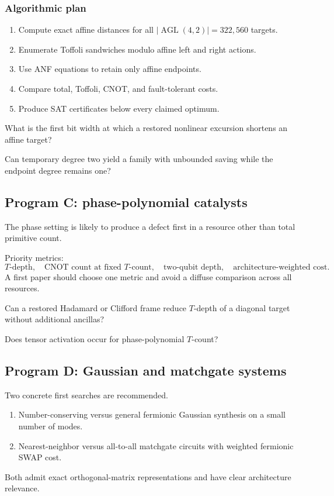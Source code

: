 \subsubsection{Algorithmic plan}
\begin{enumerate}
\item Compute exact affine distances for all $|\operatorname{AGL}(4,2)|=322{,}560$ targets.
\item Enumerate Toffoli sandwiches modulo affine left and right actions.
\item Use ANF equations to retain only affine endpoints.
\item Compare total, Toffoli, CNOT, and fault-tolerant costs.
\item Produce SAT certificates below every claimed optimum.
\end{enumerate}

\begin{question}
What is the first bit width at which a restored nonlinear excursion shortens an affine target?
\end{question}
\begin{question}
Can temporary degree two yield a family with unbounded saving while the endpoint degree remains one?
\end{question}

\subsection{Program C: phase-polynomial catalysts}
The phase setting is likely to produce a defect first in a resource other than total primitive count.

Priority metrics:
\[
T\text{-depth},
\quad
\text{CNOT count at fixed }T\text{-count},
\quad
\text{two-qubit depth},
\quad
\text{architecture-weighted cost}.
\]
A first paper should choose one metric and avoid a diffuse comparison across all resources.

\begin{question}
Can a restored Hadamard or Clifford frame reduce $T$-depth of a diagonal target without additional ancillas?
\end{question}
\begin{question}
Does tensor activation occur for phase-polynomial $T$-count?
\end{question}

\subsection{Program D: Gaussian and matchgate systems}
Two concrete first searches are recommended.
\begin{enumerate}
\item Number-conserving versus general fermionic Gaussian synthesis on a small number of modes.
\item Nearest-neighbor versus all-to-all matchgate circuits with weighted fermionic SWAP cost.
\end{enumerate}
Both admit exact orthogonal-matrix representations and have clear architecture relevance.

